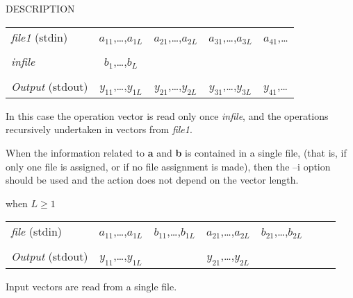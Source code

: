 \begin{qsection}{DESCRIPTION}
\begin{description}
\begin{tabular}{l|c|c|c|l} \cline{2-5}
{\em file1} (stdin)     & {$a_{11}$,\dots,$a_{1L}$}
                        & {$a_{21}$,\dots,$a_{2L}$}
                        & {$a_{31}$,\dots,$a_{3L}$}
                        & {$a_{41}$,\dots} \\ \cline{2-5}
\multicolumn{5}{c}{}    \\[-10pt]
                        \cline{2-2}
{\em infile}            & {$b_{1}$,\dots,$b_{L}$}
                        & \multicolumn{3}{c}{} \\ \cline{2-2}
\multicolumn{5}{c}{}    \\[-10pt]
                        \cline{2-5}                     
{\em Output} (stdout)   & {$y_{11}$,\dots,$y_{1L}$}
                        & {$y_{21}$,\dots,$y_{2L}$}
                        & {$y_{31}$,\dots,$y_{3L}$}
                        & {$y_{41}$,\dots} \\ \cline{2-5}
\end{tabular}
\par
In this case the operation vector is read only once
{\em infile}, and the operations recursively undertaken
in vectors from {\em file1}.
\end{description}
\par
When the information related to {\bf a} and {\bf b} is contained
in a single file,
(that is, if only one file is assigned,
or if no file assignment is made),
then the --i option should be used
and the action does not depend on the vector length.
\begin{description}
\item{when $L\geq 1$}~\\
\begin{tabular}{l|c|c|c|c|l} \cline{2-6}
{\em file} (stdin)      & {$a_{11}$,\dots,$a_{1L}$}
                        & {$b_{11}$,\dots,$b_{1L}$}
                        & {$a_{21}$,\dots,$a_{2L}$}
                        & {$b_{21}$,\dots,$b_{2L}$}
                        & ~~~ \\ \cline{2-6}
\multicolumn{6}{c}{}    \\[-10pt]
                        \cline{2-2} \cline{4-4} \cline{6-6}
{\em Output} (stdout)   & {$y_{11}$,\dots,$y_{1L}$} &
                        & {$y_{21}$,\dots,$y_{2L}$} &
                        & ~~~ \\
                        \cline{2-2} \cline{4-4} \cline{6-6}
\end{tabular}
\par
Input vectors are read from a single file.
\end{description}
\end{qsection}


